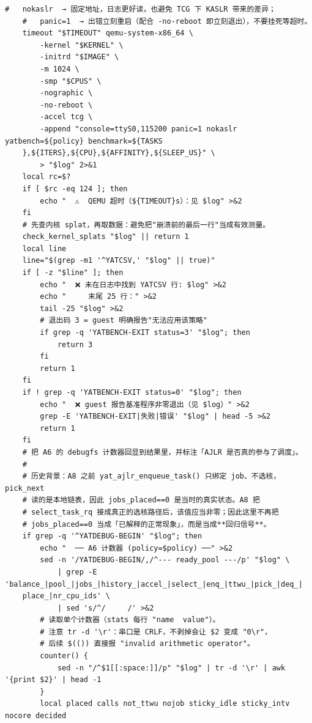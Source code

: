 \documentclass[10pt,a4paper]{article}
\newenvironment{yatpage}{\vspace*{0pt}}{\par}
\begin{document}
\newpage
\begin{yatpage}
\begin{Verbatim}[fontsize=\fontsize{8.2}{9.8}\selectfont]
    #   nokaslr  → 固定地址，日志更好读，也避免 TCG 下 KASLR 带来的差异；
    #   panic=1  → 出错立刻重启（配合 -no-reboot 即立刻退出），不要挂死等超时。
    timeout "$TIMEOUT" qemu-system-x86_64 \
        -kernel "$KERNEL" \
        -initrd "$IMAGE" \
        -m 1024 \
        -smp "$CPUS" \
        -nographic \
        -no-reboot \
        -accel tcg \
        -append "console=ttyS0,115200 panic=1 nokaslr yatbench=${policy} benchmark=${TASKS
    },${ITERS},${CPU},${AFFINITY},${SLEEP_US}" \
        > "$log" 2>&1
    local rc=$?
    if [ $rc -eq 124 ]; then
        echo "  ⚠️  QEMU 超时（${TIMEOUT}s）：见 $log" >&2
    fi
    # 先查内核 splat，再取数据：避免把"崩溃前的最后一行"当成有效测量。
    check_kernel_splats "$log" || return 1
    local line
    line="$(grep -m1 '^YATCSV,' "$log" || true)"
    if [ -z "$line" ]; then
        echo "  ❌ 未在日志中找到 YATCSV 行: $log" >&2
        echo "     末尾 25 行：" >&2
        tail -25 "$log" >&2
        # 退出码 3 = guest 明确报告"无法应用该策略"
        if grep -q 'YATBENCH-EXIT status=3' "$log"; then
            return 3
        fi
        return 1
    fi
    if ! grep -q 'YATBENCH-EXIT status=0' "$log"; then
        echo "  ❌ guest 报告基准程序非零退出（见 $log）" >&2
        grep -E 'YATBENCH-EXIT|失败|错误' "$log" | head -5 >&2
        return 1
    fi
    # 把 A6 的 debugfs 计数器回显到结果里，并标注「AJLR 是否真的参与了调度」。
    #
    # 历史背景：A8 之前 yat_ajlr_enqueue_task() 只绑定 job、不选核，pick_next
    # 读的是本地链表，因此 jobs_placed==0 是当时的真实状态。A8 把
    # select_task_rq 接成真正的选核路径后，该值应当非零；因此这里不再把
    # jobs_placed==0 当成「已解释的正常现象」，而是当成**回归信号**。
    if grep -q '^YATDEBUG-BEGIN' "$log"; then
        echo "  ── A6 计数器 (policy=$policy) ──" >&2
        sed -n '/YATDEBUG-BEGIN/,/^--- ready_pool ---/p' "$log" \
            | grep -E 'balance_|pool_|jobs_|history_|accel_|select_|enq_|ttwu_|pick_|deq_|
    place_|nr_cpu_ids' \
            | sed 's/^/     /' >&2
        # 读取单个计数器（stats 每行 "name  value"）。
        # 注意 tr -d '\r'：串口是 CRLF，不剥掉会让 $2 变成 "0\r"，
        # 后续 $(()) 直接报 "invalid arithmetic operator"。
        counter() {
            sed -n "/^$1[[:space:]]/p" "$log" | tr -d '\r' | awk '{print $2}' | head -1
        }
        local placed calls not_ttwu nojob sticky_idle sticky_intv nocore decided
\end{Verbatim}
\end{yatpage}
\end{document}
